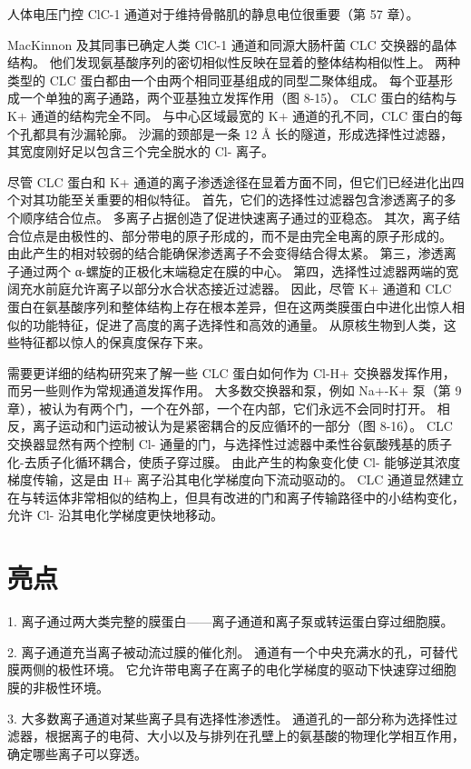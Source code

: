 人体电压门控 ClC-1 通道对于维持骨骼肌的静息电位很重要（第 57 章）。

MacKinnon 及其同事已确定人类 ClC-1 通道和同源大肠杆菌 CLC 交换器的晶体结构。 他们发现氨基酸序列的密切相似性反映在显着的整体结构相似性上。 两种类型的 CLC 蛋白都由一个由两个相同亚基组成的同型二聚体组成。 每个亚基形成一个单独的离子通路，两个亚基独立发挥作用（图 8-15）。 CLC 蛋白的结构与 K+ 通道的结构完全不同。 与中心区域最宽的 K+ 通道的孔不同，CLC 蛋白的每个孔都具有沙漏轮廓。 沙漏的颈部是一条 12 Å 长的隧道，形成选择性过滤器，其宽度刚好足以包含三个完全脱水的 Cl- 离子。

尽管 CLC 蛋白和 K+ 通道的离子渗透途径在显着方面不同，但它们已经进化出四个对其功能至关重要的相似特征。 首先，它们的选择性过滤器包含渗透离子的多个顺序结合位点。 多离子占据创造了促进快速离子通过的亚稳态。 其次，离子结合位点是由极性的、部分带电的原子形成的，而不是由完全电离的原子形成的。 由此产生的相对较弱的结合能确保渗透离子不会变得结合得太紧。 第三，渗透离子通过两个 α-螺旋的正极化末端稳定在膜的中心。 第四，选择性过滤器两端的宽阔充水前庭允许离子以部分水合状态接近过滤器。 因此，尽管 K+ 通道和 CLC 蛋白在氨基酸序列和整体结构上存在根本差异，但在这两类膜蛋白中进化出惊人相似的功能特征，促进了高度的离子选择性和高效的通量。 从原核生物到人类，这些特征都以惊人的保真度保存下来。

需要更详细的结构研究来了解一些 CLC 蛋白如何作为 Cl-H+ 交换器发挥作用，而另一些则作为常规通道发挥作用。 大多数交换器和泵，例如 Na+-K+ 泵（第 9 章），被认为有两个门，一个在外部，一个在内部，它们永远不会同时打开。 相反，离子运动和门运动被认为是紧密耦合的反应循环的一部分（图 8-16）。 CLC 交换器显然有两个控制 Cl- 通量的门，与选择性过滤器中柔性谷氨酸残基的质子化-去质子化循环耦合，使质子穿过膜。 由此产生的构象变化使 Cl- 能够逆其浓度梯度传输，这是由 H+ 离子沿其电化学梯度向下流动驱动的。 CLC 通道显然建立在与转运体非常相似的结构上，但具有改进的门和离子传输路径中的小结构变化，允许 Cl- 沿其电化学梯度更快地移动。





\section{亮点}


1. 离子通过两大类完整的膜蛋白——离子通道和离子泵或转运蛋白穿过细胞膜。 

2. 离子通道充当离子被动流过膜的催化剂。 通道有一个中央充满水的孔，可替代膜两侧的极性环境。 它允许带电离子在离子的电化学梯度的驱动下快速穿过细胞膜的非极性环境。 

3. 大多数离子通道对某些离子具有选择性渗透性。 通道孔的一部分称为选择性过滤器，根据离子的电荷、大小以及与排列在孔壁上的氨基酸的物理化学相互作用，确定哪些离子可以穿透。 

